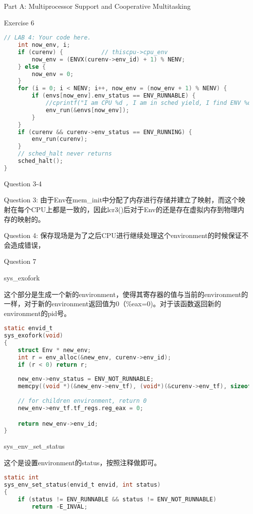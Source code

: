 \documentclass[GBK,winfonts,a4paper,10pt]{ctexart}
\begin{document}
\begin{section}{Part A: Multiprocessor Support and Cooperative Multitasking}
\begin{subsection}{Exercise 6}
\begin{lstlisting}[language=C]
	// LAB 4: Your code here.
	int now_env, i;
	if (curenv) {			// thiscpu->cpu_env
		now_env = (ENVX(curenv->env_id) + 1) % NENV;
	} else {
		now_env = 0;
	}
	for (i = 0; i < NENV; i++, now_env = (now_env + 1) % NENV) {
		if (envs[now_env].env_status == ENV_RUNNABLE) {
			//cprintf("I am CPU %d , I am in sched yield, I find ENV %d\n", thiscpu->cpu_id, now_env);
			env_run(&envs[now_env]);
		}
	}
	if (curenv && curenv->env_status == ENV_RUNNING) {
		env_run(curenv);
	}
	// sched_halt never returns
	sched_halt();
}
\end{lstlisting}
\end{subsection}

\begin{subsection}{Question 3-4}
\par
Question 3: 由于Env在mem\_init中分配了内存进行存储并建立了映射，而这个映射在每个CPU上都是一致的，因此lcr3()后对于Env的还是存在虚拟内存到物理内存的映射的。
\par
Question 4: 保存现场是为了之后CPU进行继续处理这个environment的时候保证不会造成错误，
\end{subsection}


\begin{subsection}{Question 7}
\begin{subsubsection}{sys\_exofork}
\par
这个部分是生成一个新的environment，使得其寄存器的值与当前的environment的一样，对于新的environment返回值为0（\%eax=0)。对于该函数返回新的environment的pid号。
\begin{lstlisting}[language=C]
static envid_t
sys_exofork(void)
{
	struct Env * new_env;
	int r = env_alloc(&new_env, curenv->env_id);
	if (r < 0) return r;
	
	new_env->env_status = ENV_NOT_RUNNABLE;
	memcpy((void *)(&new_env->env_tf), (void*)(&curenv->env_tf), sizeof(struct Trapframe));
	
	// for children environment, return 0
	new_env->env_tf.tf_regs.reg_eax = 0;

	return new_env->env_id;
}
\end{lstlisting}
\end{subsubsection}

\begin{subsubsection}{sys\_env\_set\_status}
\par
这个是设置environment的status，按照注释做即可。
\begin{lstlisting}[language=C]
static int
sys_env_set_status(envid_t envid, int status)
{
	if (status != ENV_RUNNABLE && status != ENV_NOT_RUNNABLE) 
		return -E_INVAL;


\end{lstlisting}
\end{subsubsection}
\end{subsection}
\end{section}
\end{document}
